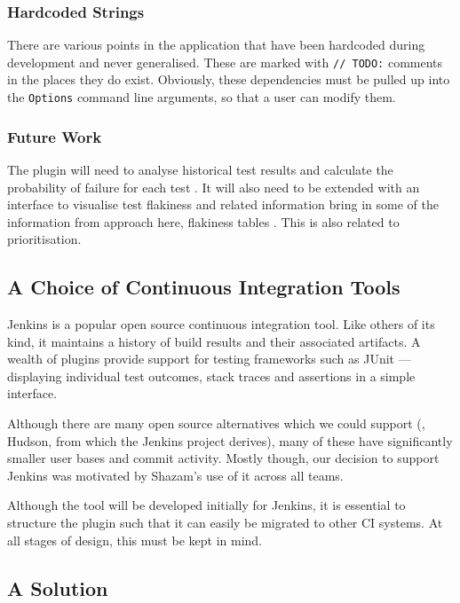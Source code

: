 \subsubsection{Hardcoded Strings}

There are various points in the application that have been hardcoded during development and never generalised. These are marked with \texttt{// TODO:} comments in the places they do exist. Obviously, these dependencies must be pulled up into the \texttt{Options} command line arguments, so that a user can modify them.

\subsubsection{Future Work}

The plugin will need to analyse historical test results and calculate the probability of failure for each test . It will also need to be extended with an interface to visualise test flakiness and related information {\todo bring in some of the information from approach here, flakiness tables \etc}. This is also related to prioritisation.


\subsection{A Choice of Continuous Integration Tools}

Jenkins \cite{Jenkins} is a popular open source continuous integration tool. Like others of its kind, it maintains a history of build results and their associated artifacts. A wealth of plugins provide support for testing frameworks such as JUnit --- displaying individual test outcomes, stack traces and assertions in a simple interface.

Although there are many open source alternatives which we could support (\eg, Hudson, from which the Jenkins project derives), many of these have significantly smaller user bases and commit activity. Mostly though, our decision to support Jenkins was motivated by Shazam's use of it across all teams.

Although the tool will be developed initially for Jenkins, it is essential to structure the plugin such that it can easily be migrated to other CI systems. At all stages of design, this must be kept in mind.


\subsection{A Solution}

